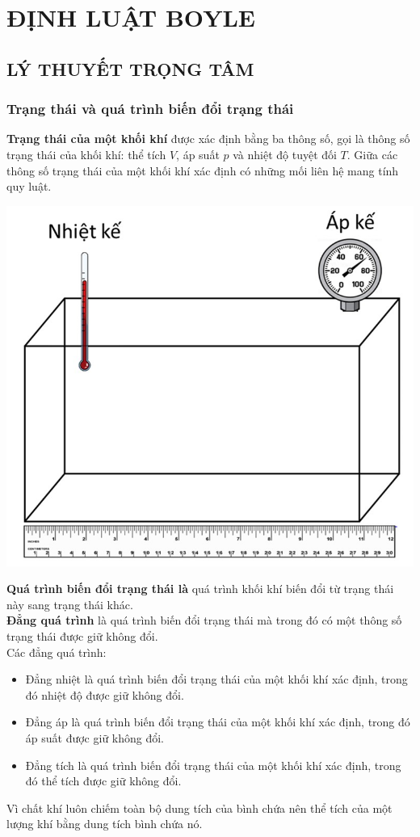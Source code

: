 \section{ĐỊNH LUẬT BOYLE}
\subsection{LÝ THUYẾT TRỌNG TÂM}
\subsubsection{Trạng thái và quá trình biến đổi trạng thái}
\begin{boxdn}
	\textbf{Trạng thái của một khối khí } được xác định bằng ba thông số, gọi là thông số trạng thái của khối khí: thể tích $V$, áp suất $p$ và nhiệt độ tuyệt đối $T$. Giữa các thông số trạng thái của một khối khí xác định có những mối liên hệ mang tính quy luật.
\end{boxdn}
\begin{center}
	\includegraphics[width=0.35\linewidth]{figs/VN12-Y24-PH-SYL-010-1}
\end{center}
\begin{boxdn}
	\textbf{Quá trình biến đổi trạng thái là} quá trình khối khí biến đổi từ trạng thái này sang trạng thái khác.\\
	\textbf{Đẳng quá trình} là quá trình biến đổi trạng thái mà trong đó có một thông số trạng thái được giữ không đổi.\\
	Các đẳng quá trình:
	\begin{itemize}
		\item Đẳng nhiệt là quá trình biến đổi trạng thái của một khối khí xác định, trong đó nhiệt độ được giữ không đổi.
		\item Đẳng áp là quá trình biến đổi trạng thái của một khối khí xác định, trong đó áp suất được giữ không đổi.
		\item Đẳng tích là quá trình biến đổi trạng thái của một khối khí xác định, trong đó thể tích được giữ không đổi.
	\end{itemize}
\end{boxdn}
\begin{luuy}
	Vì chất khí luôn chiếm toàn bộ dung tích của bình chứa nên thể tích của một lượng khí bằng dung tích bình chứa nó.
\end{luuy}

